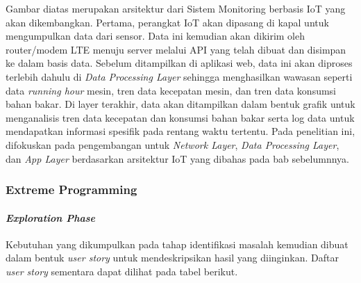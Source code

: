 Gambar diatas merupakan arsitektur dari Sistem Monitoring berbasis IoT yang akan dikembangkan. Pertama, perangkat IoT akan dipasang di kapal untuk mengumpulkan data dari sensor. Data ini kemudian akan dikirim oleh router/modem LTE menuju server melalui API yang telah dibuat dan disimpan ke dalam basis data. Sebelum ditampilkan di aplikasi web, data ini akan diproses terlebih dahulu di \textit{Data Processing Layer} sehingga menghasilkan wawasan seperti data \textit{running hour} mesin, tren data kecepatan mesin, dan tren data konsumsi bahan bakar. Di layer terakhir, data akan ditampilkan dalam bentuk grafik untuk menganalisis tren data kecepatan dan konsumsi bahan bakar serta log data untuk mendapatkan informasi spesifik pada rentang waktu tertentu. Pada penelitian ini, difokuskan pada pengembangan untuk \textit{Network Layer}, \textit{Data Processing Layer}, dan \textit{App Layer} berdasarkan arsitektur IoT yang dibahas pada bab sebelumnnya.

\subsubsection{Extreme Programming}

\paragraph{\textit{Exploration Phase}}

    Kebutuhan yang dikumpulkan pada tahap identifikasi masalah kemudian dibuat dalam bentuk \textit{user story} untuk mendeskripsikan hasil yang diinginkan. Daftar \textit{user story} sementara dapat dilihat pada tabel berikut.

    \newpage

